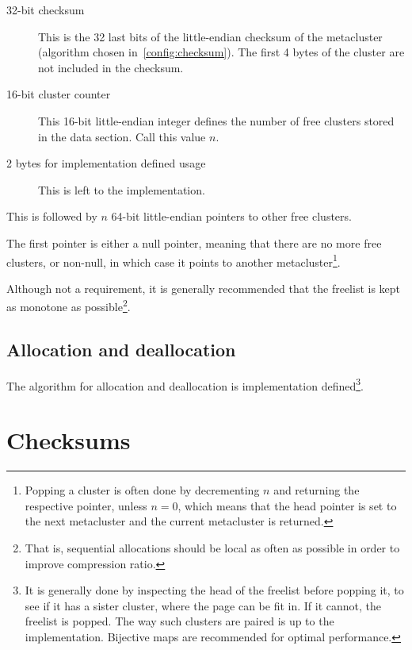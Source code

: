 \documentclass[11pt,a4paper]{report}
\begin{document}
        \begin{description}
            \item [32-bit checksum] This is the 32 last bits of the
                little-endian checksum of the metacluster (algorithm chosen
                in~\ref{config:checksum}). The first 4 bytes of the cluster are
                not included in the checksum.
            \item [16-bit cluster counter] This 16-bit little-endian integer
                defines the number of free clusters stored in the data section.
                Call this value $n$.
            \item [2 bytes for implementation defined usage] This is
                left to the implementation.
        \end{description}

        This is followed by $n$ 64-bit little-endian pointers to other free
        clusters.

        The first pointer is either a null pointer, meaning that there are no
        more free clusters, or non-null, in which case it points to another
        metacluster\footnote{Popping a cluster is often done by decrementing
        $n$ and returning the respective pointer, unless $n = 0$, which means
        that the head pointer is set to the next metacluster and the current
        metacluster is returned.}.

        Although not a requirement, it is generally recommended that
        the freelist is kept as monotone as possible\footnote{That is,
        sequential allocations should be local as often as possible in
        order to improve compression ratio.}.

        \subsection{Allocation and deallocation}
        The algorithm for allocation and deallocation is implementation
        defined\footnote{It is generally done by inspecting the head of the
            freelist before popping it, to see if it has a sister cluster,
            where the page can be fit in. If it cannot, the freelist is popped.
            The way such clusters are paired is up to the implementation.
            Bijective maps are recommended for optimal performance.}.

    \section{Checksums}
\end{document}
